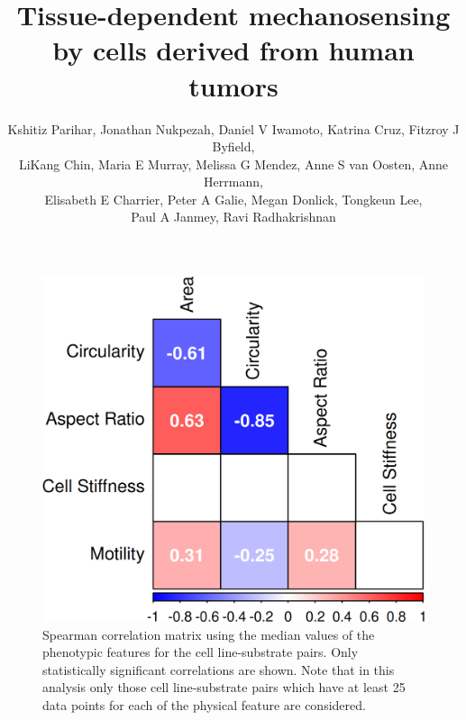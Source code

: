 \documentclass[11pt,letterpaper,english,oneside]{article} %
\author{Kshitiz Parihar, 
Jonathan Nukpezah, 
Daniel V Iwamoto, 
Katrina Cruz, 
Fitzroy J Byfield, \\
LiKang Chin, 
Maria E Murray, 
Melissa G Mendez, 
Anne S van Oosten, 
Anne Herrmann, \\
Elisabeth E Charrier, 
Peter A Galie, 
Megan Donlick, 
Tongkeun Lee, \\
Paul A Janmey, 
Ravi Radhakrishnan
}
\title{Tissue-dependent mechanosensing by cells derived from human tumors}
\date{}
\begin{document}
\renewcommand{\figurename}{Supplementary Figure}

\maketitle








\begin{figure}
    \centering
    \includegraphics[scale=0.8]{../Figures/supplementary_figure1.png}
    \caption{Spearman correlation matrix using the median values of the phenotypic features for the cell line-substrate pairs. Only statistically significant correlations are shown.
    Note that in this analysis only those cell line-substrate pairs which have at least 25 data points for each of the physical feature are considered.}
    \label{fig:fig1}
\end{figure}
\clearpage
\end{document}
